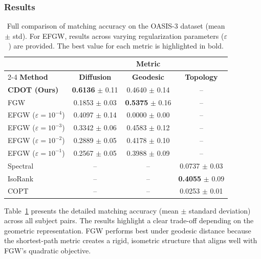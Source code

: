 \documentclass{article}
\theoremstyle{plain}
\theoremstyle{definition}
\theoremstyle{remark}
\begin{document}
\subsubsection{Results}

\begin{table}[t]
	\centering
	\setlength{\tabcolsep}{15pt}
	\caption{Full comparison of matching accuracy on the OASIS-3 dataset (mean $\pm$ std). For EFGW, results across varying regularization parameters ($\varepsilon$) are provided. The best value for each metric is highlighted in bold.}
	\label{tab:oasis-full-results}
	\renewcommand{\arraystretch}{1.3}
	\begin{tabular}{lccc}
		\toprule
		& \multicolumn{3}{c}{\textbf{Metric}} \\
		\cmidrule(lr){2-4}
		\textbf{Method} & \textbf{Diffusion} & \textbf{Geodesic} & \textbf{Topology} \\
		\midrule
		\textbf{CDOT (Ours)} & \textbf{0.6136} $\pm$ 0.11 & 0.4640 $\pm$ 0.14 & -- \\
		FGW & 0.1853 $\pm$ 0.03 & \textbf{0.5375} $\pm$ 0.16 & -- \\
		EFGW ($\varepsilon=10^{-4}$) & 0.4097 $\pm$ 0.14 & 0.0000 $\pm$ 0.00 & -- \\
		EFGW ($\varepsilon=10^{-3}$) & 0.3342 $\pm$ 0.06 & 0.4583 $\pm$ 0.12 & -- \\
		EFGW ($\varepsilon=10^{-2}$) & 0.2889 $\pm$ 0.05 & 0.4178 $\pm$ 0.10 & -- \\
		EFGW ($\varepsilon=10^{-1}$) & 0.2567 $\pm$ 0.05 & 0.3988 $\pm$ 0.09 & -- \\
		Spectral & -- & -- & 0.0737 $\pm$ 0.03 \\
		IsoRank & -- & -- & \textbf{0.4055} $\pm$ 0.09 \\
		COPT & -- & -- & 0.0253 $\pm$ 0.01 \\
		\bottomrule
	\end{tabular}
\end{table}

Table~\ref{tab:oasis-full-results} presents the detailed matching accuracy (mean $\pm$ standard deviation) across all subject pairs. The results highlight a clear trade-off depending on the geometric representation. FGW performs best under geodesic distance because the shortest-path metric creates a rigid, isometric structure that aligns well with FGW's quadratic objective.
\end{document}
